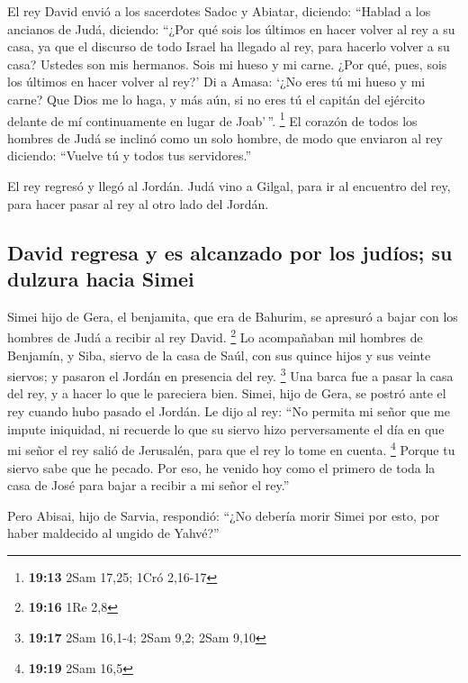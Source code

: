 \begin{paracol}{2}
 El rey David envió a los sacerdotes Sadoc y Abiatar,
diciendo: ``Hablad a los ancianos de Judá, diciendo: ``¿Por qué sois los
últimos en hacer volver al rey a su casa, ya que el discurso de todo
Israel ha llegado al rey, para hacerlo volver a su casa? 
Ustedes son mis hermanos. Sois mi hueso y mi carne. ¿Por qué, pues, sois
los últimos en hacer volver al rey?'  Di a Amasa: `¿No
eres tú mi hueso y mi carne? Que Dios me lo haga, y más aún, si no eres
tú el capitán del ejército delante de mí continuamente en lugar de
Joab'\,''. \footnote{\textbf{19:13} 2Sam 17,25; 1Cró 2,16-17}
 El corazón de todos los hombres de Judá se inclinó como
un solo hombre, de modo que enviaron al rey diciendo: ``Vuelve tú y
todos tus servidores.''

 El rey regresó y llegó al Jordán. Judá vino a Gilgal,
para ir al encuentro del rey, para hacer pasar al rey al otro lado del
Jordán.

\hypertarget{david-regresa-y-es-alcanzado-por-los-juduxedos-su-dulzura-hacia-simei}{%
\subsection{David regresa y es alcanzado por los judíos; su dulzura
hacia
Simei}\label{david-regresa-y-es-alcanzado-por-los-juduxedos-su-dulzura-hacia-simei}}

 Simei hijo de Gera, el benjamita, que era de Bahurim, se
apresuró a bajar con los hombres de Judá a recibir al rey David.
\footnote{\textbf{19:16} 1Re 2,8}  Lo acompañaban mil
hombres de Benjamín, y Siba, siervo de la casa de Saúl, con sus quince
hijos y sus veinte siervos; y pasaron el Jordán en presencia del rey.
\footnote{\textbf{19:17} 2Sam 16,1-4; 2Sam 9,2; 2Sam 9,10}
 Una barca fue a pasar la casa del rey, y a hacer lo que
le pareciera bien. Simei, hijo de Gera, se postró ante el rey cuando
hubo pasado el Jordán.  Le dijo al rey: ``No permita mi
señor que me impute iniquidad, ni recuerde lo que su siervo hizo
perversamente el día en que mi señor el rey salió de Jerusalén, para que
el rey lo tome en cuenta. \footnote{\textbf{19:19} 2Sam 16,5}
 Porque tu siervo sabe que he pecado. Por eso, he venido
hoy como el primero de toda la casa de José para bajar a recibir a mi
señor el rey.''

 Pero Abisai, hijo de Sarvia, respondió: ``¿No debería
morir Simei por esto, por haber maldecido al ungido de Yahvé?''


\end{paracol}
